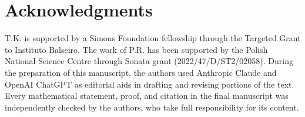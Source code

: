 \documentclass[12pt]{article}
\numberwithin{equation}{section}
\theoremstyle{definition}
\theoremstyle{remark}
\newcommand{\?}{\overset{?}{=}}
\begin{document}
\begingroup
\renewcommand{\addcontentsline}[3]{}
\section*{Acknowledgments}

T.K. is supported by a Simons Foundation fellowship through the Targeted Grant to Instituto Balseiro. The work of P.R. has been supported by the Polish National Science Centre through Sonata grant (2022/47/D/ST2/02058). 
During the preparation of this manuscript, the authors used Anthropic Claude and OpenAI ChatGPT as editorial aids in drafting and revising portions of the text. Every mathematical statement, proof, and citation in the final manuscript was independently checked by the authors, who take full responsibility for its content.

\endgroup
\end{document}
